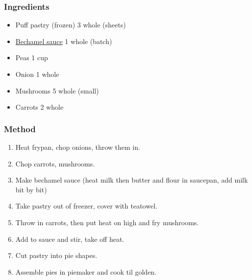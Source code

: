 \documentclass[]{article}
\begin{document}
\subsubsection*{\Large Ingredients}
\begin{multicols}{2}
\begin{itemize}
 \item Puff pastry (frozen) \hfill 3 whole (sheets)
 \item \hyperref[rec:Bechamel]{Bechamel sauce} \hfill 1 whole (batch)
 \item Peas \hfill 1 cup
 \item Onion \hfill 1 whole
 \item Mushrooms \hfill 5 whole (small)
 \item Carrots \hfill 2 whole
\end{itemize}
\end{multicols}
\subsubsection*{\Large Method}
\begin{enumerate}[font=\huge\color{accent}]
	\item Heat frypan, chop onions, throw them in.
	\item Chop carrots, mushrooms.
	\item Make bechamel sauce (heat milk then butter and flour in saucepan, add milk bit by bit)
	\item Take pastry out of freezer, cover with teatowel.
	\item Throw in carrots, then put heat on high and fry mushrooms.
	\item Add to sauce and stir, take off heat.
	\item Cut pastry into pie shapes.
	\item Assemble pies in piemaker and cook til golden.
\end{enumerate}
\newpage
{}\label{rec:Potato and Onion Pies}
\end{document}
